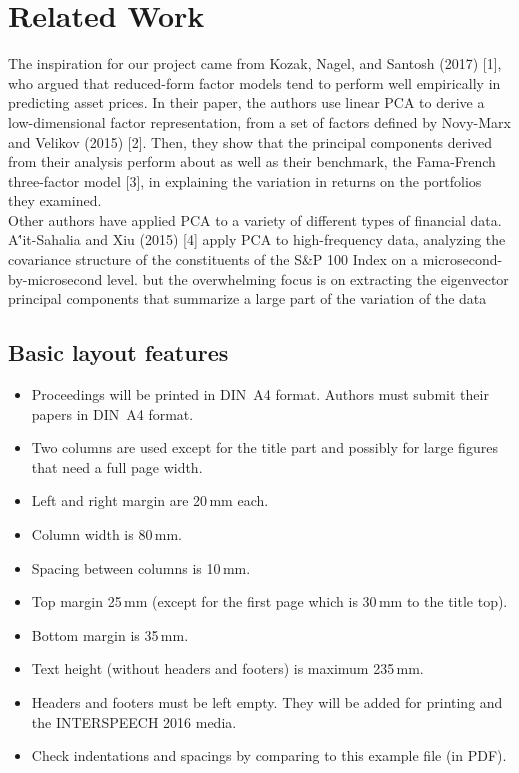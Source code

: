 \documentclass[a4paper]{article}
\begin{document}
  
  \section{Related Work}

   The inspiration for our project came from Kozak, Nagel, and Santosh (2017) [1], who argued that reduced-form factor models tend to perform well empirically in predicting asset prices. In their paper, the authors use linear PCA to derive a low-dimensional factor representation, from a set of factors defined by Novy-Marx and Velikov (2015) [2]. Then, they show that the principal components derived from their analysis perform about as well as their benchmark, the Fama-French three-factor model [3], in explaining the variation in returns on the portfolios they examined. \\ Other authors have applied PCA to a variety of different types of financial data. A{\''i}t-Sahalia and Xiu (2015) [4] apply PCA to high-frequency data, analyzing the covariance structure of the constituents of the S\&P 100 Index on a microsecond-by-microsecond level. but the overwhelming focus is on extracting the eigenvector principal components that summarize a large part of the variation of the data 
   
    \subsection{Basic layout features}

      \begin{itemize}
        \item Proceedings will be printed in DIN~A4 format. Authors must submit their papers in DIN~A4 format.
        \item Two columns are used except for the title part and possibly for large figures that need a full page width.
        \item Left and right margin are 20\,mm each.
        \item Column width is 80\,mm.
        \item Spacing between columns is 10\,mm.
        \item Top margin 25\,mm (except for the first page which is 30\,mm to the title top).
        \item Bottom margin is 35\,mm.
        \item Text height (without headers and footers) is maximum 235\,mm.
        \item Headers and footers must be left empty. They will be added for printing and the INTERSPEECH 2016 media.
        \item Check indentations and spacings by comparing to this example file (in PDF).
      \end{itemize}
\end{document}
